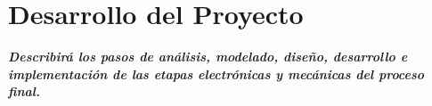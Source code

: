 \chapter{Desarrollo del Proyecto}\label{ch:ThesisDesProy}

\textit{\textbf{Describirá los pasos de análisis, modelado, diseño, desarrollo e implementación de las etapas electrónicas y mecánicas del proceso final.}}

